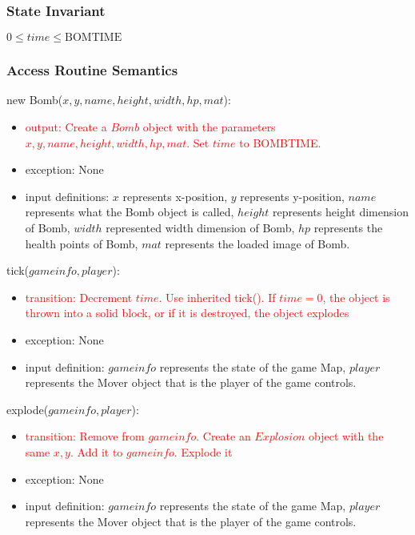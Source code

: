 \documentclass[12pt]{article}
\newcommand{\Implies}{\Rightarrow}
\newcommand{\m}[1]{\mbox{#1}}
\begin{document}
\subsubsection*{State Invariant}

$0 \leq time \leq \text{BOMTIME}$

\subsubsection*{Access Routine Semantics}

new Bomb($x, y, name, height, width, hp, mat$):
\begin{itemize}
    \item \textcolor{red}{output: Create a $Bomb$ object with the parameters $x, y, name, height, width, hp, mat$. Set $time$ to BOMBTIME.}
    \item exception: None
    \item input definitions: $x$ represents x-position, $y$ represents y-position, $name$ represents what the Bomb object is called, $height$ represents height dimension of Bomb, $width$ represented width dimension of Bomb, $hp$ represents the health points of Bomb, $mat$ represents the loaded image of Bomb.
\end{itemize}

\noindent tick($gameinfo, player$):
\begin{itemize}
    \item \textcolor{red}{transition: Decrement $time$. Use inherited tick(). If $time = 0$, the object is thrown into a solid block, or if it is destroyed, the object explodes}
    \item exception: None
    \item input definition: $gameinfo$ represents the state of the game Map, $player$ represents the Mover object that is the player of the game controls.
\end{itemize}

\noindent explode($gameinfo, player$):
\begin{itemize}
    \item \textcolor{red}{transition: Remove from $gameinfo$. Create an $Explosion$ object with the same $x, y$. Add it to $gameinfo$. Explode it}
    \item exception: None
    \item input definition: $gameinfo$ represents the state of the game Map, $player$ represents the Mover object that is the player of the game controls.
\end{itemize}
\end{document}
